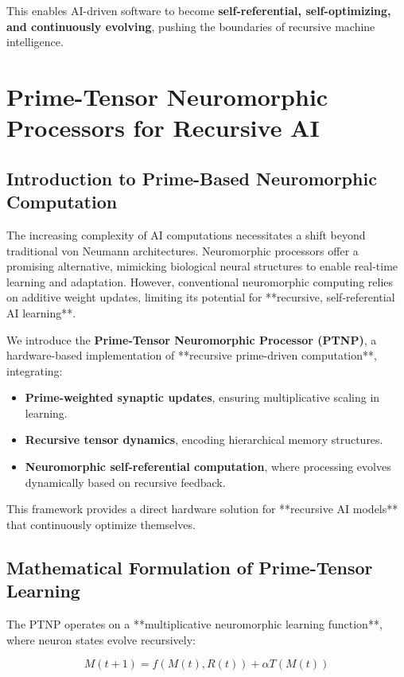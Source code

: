 \documentclass{article}
\theoremstyle{plain}
\theoremstyle{plain}
\theoremstyle{definition}
\theoremstyle{remark}
\begin{document}
This enables AI-driven software to become \textbf{self-referential, self-optimizing, and continuously evolving}, pushing the boundaries of recursive machine intelligence.
\section{Prime-Tensor Neuromorphic Processors for Recursive AI}

\subsection{Introduction to Prime-Based Neuromorphic Computation}

The increasing complexity of AI computations necessitates a shift beyond traditional von Neumann architectures. Neuromorphic processors offer a promising alternative, mimicking biological neural structures to enable real-time learning and adaptation. However, conventional neuromorphic computing relies on additive weight updates, limiting its potential for **recursive, self-referential AI learning**.

We introduce the \textbf{Prime-Tensor Neuromorphic Processor (PTNP)}, a hardware-based implementation of **recursive prime-driven computation**, integrating:
\begin{itemize}
    \item \textbf{Prime-weighted synaptic updates}, ensuring multiplicative scaling in learning.
    \item \textbf{Recursive tensor dynamics}, encoding hierarchical memory structures.
    \item \textbf{Neuromorphic self-referential computation}, where processing evolves dynamically based on recursive feedback.
\end{itemize}

This framework provides a direct hardware solution for **recursive AI models** that continuously optimize themselves.

\subsection{Mathematical Formulation of Prime-Tensor Learning}

The PTNP operates on a **multiplicative neuromorphic learning function**, where neuron states evolve recursively:

\begin{equation}
M(t+1) = f(M(t), R(t)) + \alpha T(M(t))
\end{equation}
\end{document}
